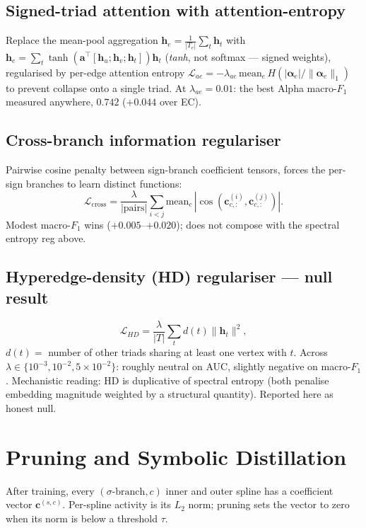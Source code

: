 \documentclass[11pt, a4paper]{article}
\begin{document}
\subsection{Signed-triad attention with attention-entropy}
\label{sec:reg-attention}

Replace the mean-pool aggregation $\mathbf{h}_e = \tfrac{1}{|T_e|}\sum_t \mathbf{h}_t$
with $\mathbf{h}_e = \sum_t \tanh(\mathbf{a}^\top [\mathbf{h}_u; \mathbf{h}_v; \mathbf{h}_t]) \mathbf{h}_t$
(\emph{tanh}, not softmax — signed weights), regularised by
per-edge attention entropy
$\mathcal{L}_{ae} = -\lambda_{ae}\,\mathrm{mean}_e\, H(|\boldsymbol{\alpha}_e| / \|\boldsymbol{\alpha}_e\|_1)$
to prevent collapse onto a single triad. At $\lambda_{ae}\!=\!0.01$:
the best Alpha macro-$F_1$ measured anywhere, $0.742$ ($+0.044$ over EC).

\subsection{Cross-branch information regulariser}
\label{sec:reg-crossbranch}

Pairwise cosine penalty between sign-branch coefficient tensors,
forces the per-sign branches to learn distinct functions:
\[
\mathcal{L}_{\mathrm{cross}} = \frac{\lambda}{|\mathrm{pairs}|} \sum_{i < j} \mathrm{mean}_c\, |\cos(\mathbf{c}^{(i)}_{c, :}, \mathbf{c}^{(j)}_{c, :})|.
\]
Modest macro-$F_1$ wins ($+0.005$--$+0.020$); does not compose with
the spectral entropy reg above.

\subsection{Hyperedge-density (HD) regulariser — null result}
\label{sec:reg-hd}

\[
\mathcal{L}_{HD} = \frac{\lambda}{|T|} \sum_t d(t) \|\mathbf{h}_t\|^2,
\]
$d(t) = $ number of other triads sharing at least one vertex with
$t$. Across $\lambda \in \{10^{-3}, 10^{-2}, 5\!\times\!10^{-2}\}$:
roughly neutral on AUC, slightly negative on macro-$F_1$.
Mechanistic reading: HD is duplicative of spectral entropy
(both penalise embedding magnitude weighted by a structural
quantity). Reported here as honest null.

\section{Pruning and Symbolic Distillation}

After training, every $(\sigma\text{-branch}, c)$ inner and outer
spline has a coefficient vector $\mathbf{c}^{(s, c)}$. Per-spline
activity is its $L_2$ norm; pruning sets the vector to zero when
its norm is below a threshold $\tau$.
\end{document}
